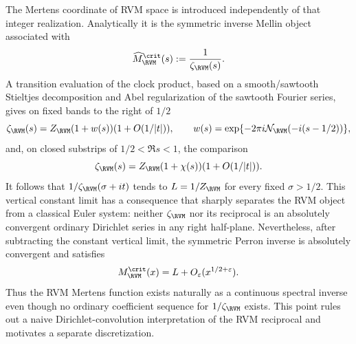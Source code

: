 The Mertens coordinate of RVM space is introduced independently of that
integer realization.  Analytically it is the symmetric inverse Mellin object
associated with
\begin{equation}
 \widehat M_{\RVM}^{\crit}(s)
 :=\frac1{\zeta_{\RVM}(s)}.
 \label{eq:intro-Mhat}
\end{equation}
A transition evaluation of the clock product, based on a smooth/sawtooth
Stieltjes decomposition and Abel regularization of the sawtooth Fourier series,
gives on fixed bands to the right of $1/2$
\begin{equation}
 \zeta_{\RVM}(s)
 =Z_{\RVM}(1+w(s))(1+O(1/|t|)),
 \qquad
 w(s)=\exp\{-2\pi i\mathcal N_{\RVM}(-i(s-1/2))\},
 \label{eq:intro-transition}
\end{equation}
and, on closed substrips of $1/2<\Re s<1$, the comparison
\begin{equation}
 \zeta_{\RVM}(s)
 =Z_{\RVM}(1+\chi(s))(1+O(1/|t|)).
 \label{eq:intro-transition-chi}
\end{equation}
It follows that $1/\zeta_{\RVM}(\sigma+it)$ tends to
$L=1/Z_{\RVM}$ for every fixed $\sigma>1/2$.  This vertical constant limit has
a consequence that sharply separates the RVM object from a classical Euler
system: neither $\zeta_{\RVM}$ nor its reciprocal is an absolutely convergent
ordinary Dirichlet series in any right half-plane.  Nevertheless, after
subtracting the constant vertical limit, the symmetric Perron inverse is
absolutely convergent and satisfies
\begin{equation}
 M_{\RVM}^{\crit}(x)
 =L+O_\varepsilon(x^{1/2+\varepsilon}).
 \label{eq:intro-Mbound}
\end{equation}
Thus the RVM Mertens function exists naturally as a continuous spectral inverse
even though no ordinary coefficient sequence for $1/\zeta_{\RVM}$ exists.
This point rules out a naive Dirichlet-convolution interpretation of the RVM
reciprocal and motivates a separate discretization.

